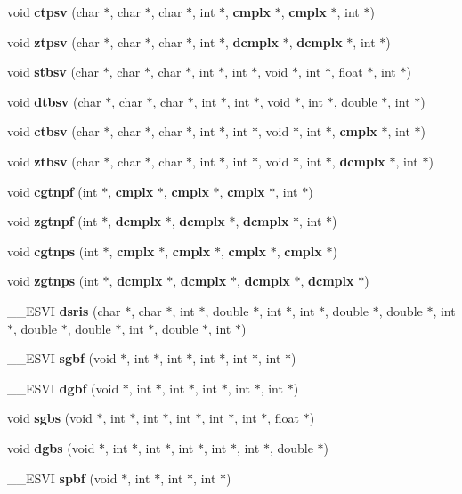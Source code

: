 \begin{CompactItemize}
\item 
void {\bf ctpsv} (char $\ast$, char $\ast$, char $\ast$, int $\ast$, {\bf cmplx} $\ast$, {\bf cmplx} $\ast$, int $\ast$)
\item 
void {\bf ztpsv} (char $\ast$, char $\ast$, char $\ast$, int $\ast$, {\bf dcmplx} $\ast$, {\bf dcmplx} $\ast$, int $\ast$)
\item 
void {\bf stbsv} (char $\ast$, char $\ast$, char $\ast$, int $\ast$, int $\ast$, void $\ast$, int $\ast$, float $\ast$, int $\ast$)
\item 
void {\bf dtbsv} (char $\ast$, char $\ast$, char $\ast$, int $\ast$, int $\ast$, void $\ast$, int $\ast$, double $\ast$, int $\ast$)
\item 
void {\bf ctbsv} (char $\ast$, char $\ast$, char $\ast$, int $\ast$, int $\ast$, void $\ast$, int $\ast$, {\bf cmplx} $\ast$, int $\ast$)
\item 
void {\bf ztbsv} (char $\ast$, char $\ast$, char $\ast$, int $\ast$, int $\ast$, void $\ast$, int $\ast$, {\bf dcmplx} $\ast$, int $\ast$)
\item 
void {\bf cgtnpf} (int $\ast$, {\bf cmplx} $\ast$, {\bf cmplx} $\ast$, {\bf cmplx} $\ast$, int $\ast$)
\item 
void {\bf zgtnpf} (int $\ast$, {\bf dcmplx} $\ast$, {\bf dcmplx} $\ast$, {\bf dcmplx} $\ast$, int $\ast$)
\item 
void {\bf cgtnps} (int $\ast$, {\bf cmplx} $\ast$, {\bf cmplx} $\ast$, {\bf cmplx} $\ast$, {\bf cmplx} $\ast$)
\item 
void {\bf zgtnps} (int $\ast$, {\bf dcmplx} $\ast$, {\bf dcmplx} $\ast$, {\bf dcmplx} $\ast$, {\bf dcmplx} $\ast$)
\item 
\_\-\_\-ESVI {\bf dsris} (char $\ast$, char $\ast$, int $\ast$, double $\ast$, int $\ast$, int $\ast$, double $\ast$, double $\ast$, int $\ast$, double $\ast$, double $\ast$, int $\ast$, double $\ast$, int $\ast$)
\item 
\_\-\_\-ESVI {\bf sgbf} (void $\ast$, int $\ast$, int $\ast$, int $\ast$, int $\ast$, int $\ast$)
\item 
\_\-\_\-ESVI {\bf dgbf} (void $\ast$, int $\ast$, int $\ast$, int $\ast$, int $\ast$, int $\ast$)
\item 
void {\bf sgbs} (void $\ast$, int $\ast$, int $\ast$, int $\ast$, int $\ast$, int $\ast$, float $\ast$)
\item 
void {\bf dgbs} (void $\ast$, int $\ast$, int $\ast$, int $\ast$, int $\ast$, int $\ast$, double $\ast$)
\item 
\_\-\_\-ESVI {\bf spbf} (void $\ast$, int $\ast$, int $\ast$, int $\ast$)

\end{CompactItemize}
